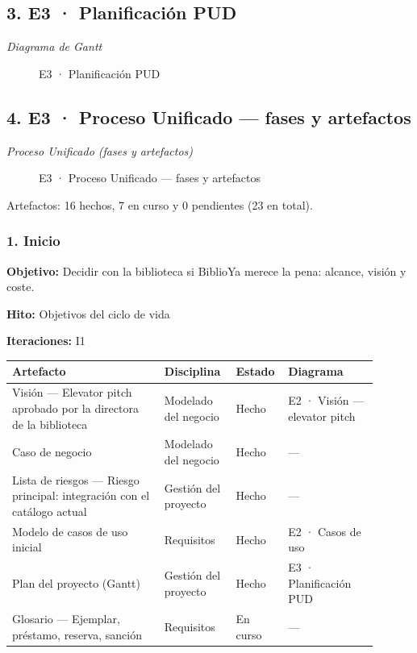 \subsection*{3. E3 · Planificación PUD}

\emph{Diagrama de Gantt}

\begin{figure}[H]
\centering
{}
\caption{E3 · Planificación PUD}
\end{figure}

\subsection*{4. E3 · Proceso Unificado — fases y artefactos}

\emph{Proceso Unificado (fases y artefactos)}

\begin{figure}[H]
\centering
{}
\caption{E3 · Proceso Unificado — fases y artefactos}
\end{figure}

Artefactos: 16 hechos, 7 en curso y 0 pendientes (23 en total).

\subsubsection*{1. Inicio}

\textbf{Objetivo:} Decidir con la biblioteca si BiblioYa merece la pena: alcance, visión y coste.

\textbf{Hito:} Objetivos del ciclo de vida

\textbf{Iteraciones:} I1

{\small
\begin{longtable}{@{}>{\raggedright\arraybackslash}p{0.393\linewidth}>{\raggedright\arraybackslash}p{0.179\linewidth}>{\raggedright\arraybackslash}p{0.092\linewidth}>{\raggedright\arraybackslash}p{0.234\linewidth}@{}}
\toprule
\textbf{Artefacto} & \textbf{Disciplina} & \textbf{Estado} & \textbf{Diagrama} \\
\midrule
\endhead
Visión — Elevator pitch aprobado por la directora de la biblioteca & Modelado del negocio & Hecho & E2 · Visión — elevator pitch \\
Caso de negocio & Modelado del negocio & Hecho & — \\
Lista de riesgos — Riesgo principal: integración con el catálogo actual & Gestión del proyecto & Hecho & — \\
Modelo de casos de uso inicial & Requisitos & Hecho & E2 · Casos de uso \\
Plan del proyecto (Gantt) & Gestión del proyecto & Hecho & E3 · Planificación PUD \\
Glosario — Ejemplar, préstamo, reserva, sanción & Requisitos & En curso & — \\
\bottomrule
\end{longtable}}

